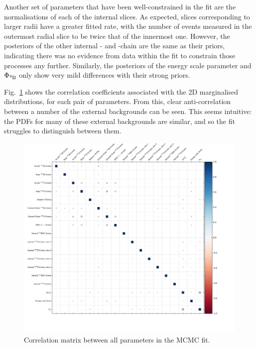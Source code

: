 Another set of parameters that have been well-constrained in the fit are the normalisations of each of the internal  slices. As expected, slices corresponding to larger radii have a greater fitted rate, with the number of events measured in the outermost radial slice to be twice that of the innermost one. However, the posteriors of the other internal - and -chain are the same as their priors, indicating there was no evidence from data within the fit to constrain those processes any further. Similarly, the posteriors of the energy scale parameter and $\Phi_{\beight{}}$ only show very mild differences with their strong priors.

Fig.~\ref{fig:corr_plots_params} shows the correlation coefficients associated with the 2D marginalised distributions, for each pair of parameters. From this, clear anti-correlation between a number of the external backgrounds can be seen. This seems intuitive: the PDFs for many of these external backgrounds are similar, and so the fit struggles to distinguish between them.

\begin{figure}[!th]
    \centering
    \includegraphics[width=\textwidth]{6_SolarAnalysis/images/corr_coeff.pdf}
    \caption[Correlation matrix between all parameters in the MCMC fit]
    {Correlation matrix between all parameters in the MCMC fit.}
    \label{fig:corr_plots_params}
\end{figure}

